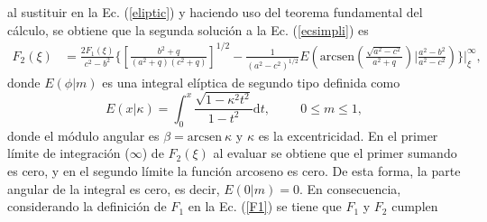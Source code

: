 al sustituir en la Ec. (\ref{eliptic}) y haciendo uso del teorema fundamental del cálculo, se obtiene que la segunda solución a la Ec. (\ref{ecsimpli}) es 
\begin{align}
    F_2(\xi)&=\frac{2F_1(\xi)}{c^2-b^2}\Bigg\{\left[\frac{b^2+q}{(a^2+q)(c^2+q)}\right]^{1/2}-\frac{1}{(a^2-c^2)^{1/2}}E\left(\mbox{arcsen}\left(\frac{\sqrt{a^2-c^2}}{a^2+q}\right)\Bigg|\frac{a^2-b^2}{a^2-c^2}\right)\Bigg\}\Bigg|_\xi^{\infty},
\end{align}
donde $E(\phi|m)$ es una integral elíptica de segundo tipo definida como \cite{Abramowitz}
\begin{equation}
    E(x|\kappa)=\int_{0}^x\frac{\sqrt{1-\kappa^2t^2}}{1-t^2}\text{d}t,\hspace{1cm}0\leq m\leq 1,
\end{equation}
donde el módulo angular es $\beta=\mbox{arcsen}\:\kappa$ y $\kappa$ es la excentricidad. En el primer límite de integración ($\infty$) de $F_2(\xi)$ al evaluar se obtiene que el primer sumando es cero, y en el segundo límite la función arcoseno es cero. De esta forma, la parte angular de la integral es cero, es decir, $E(0|m)=0$. En consecuencia, considerando la definición de $F_1$ en la Ec. (\ref{F1}) se tiene que $F_1$ y $F_2$ cumplen

